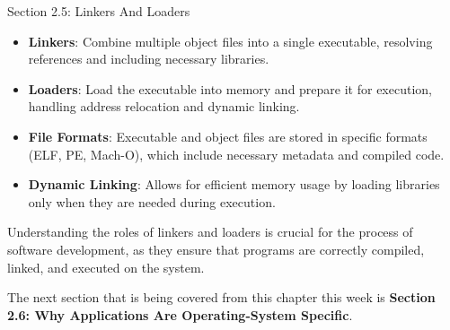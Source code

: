 \begin{notes}{Section 2.5: Linkers And Loaders}
\begin{highlight}
    \begin{itemize}
        \item \textbf{Linkers}: Combine multiple object files into a single executable, resolving references and including necessary libraries.
        \item \textbf{Loaders}: Load the executable into memory and prepare it for execution, handling address relocation and dynamic linking.
        \item \textbf{File Formats}: Executable and object files are stored in specific formats (ELF, PE, Mach-O), which include necessary metadata and compiled code.
        \item \textbf{Dynamic Linking}: Allows for efficient memory usage by loading libraries only when they are needed during execution.
    \end{itemize}
    
    Understanding the roles of linkers and loaders is crucial for the process of software development, as they ensure that programs are correctly compiled, linked, and executed on the system.
    
    \end{highlight}
\end{notes}

The next section that is being covered from this chapter this week is \textbf{Section 2.6: Why Applications Are Operating-System Specific}.

